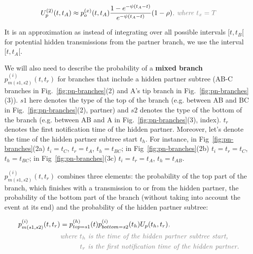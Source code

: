 \documentclass[a4paper,10pt]{article}
\begin{document}
\begin{equation}
U_p^{(2)}(t, t_A) \approx p_o^{(x)}(t, t_A) \frac{1 - e^{-\psi(t_A - t)}}{e^{-\psi(t_A - t)}} (1 - \rho)\textit{\color{gray}, where $t_x =T$}
\end{equation}

It is an approximation as instead of integrating over all possible intervals $[t, t_B[$ for potential hidden transmissions from the partner branch, we use the interval $[t, t_A[$.
 

We will also need to describe the probability of a\textbf{ mixed branch} $p_{m(s1,s2)}^{(i)}(t,t_r)$ for branches that include a hidden partner subtree (AB-C branches in Fig.~\ref{fig:pn-branches}(2) and A's tip branch in Fig.~\ref{fig:pn-branches}(3)). $s1$ here denotes the type of the top of the branch (e.g. between AB and BC in Fig.~\ref{fig:pn-branches}(2), partner) and $s2$ denotes the type of the bottom of the branch (e.g. between AB and A in Fig.~\ref{fig:pn-branches}(3), index). $t_r$ denotes the first notification time of the hidden partner. Moreover, let's denote the time of the hidden partner subtree start $t_h$.  For instance, in Fig~\ref{fig:pn-branches}(2a) $t_i=t_C$, $t_r=t_A$, $t_h=t_{BC}$; in Fig~\ref{fig:pn-branches}(2b) $t_i=t_r=t_C$, $t_h=t_{BC}$; in Fig~\ref{fig:pn-branches}(3c) $t_i=t_r=t_A$, $t_h=t_{AB}$. 

$p_{m(s1,s2)}^{(i)}(t,t_r)$ combines three elements: the probability of the top part of the branch, which finishes with a transmission to or from the hidden partner, the probability of the bottom part of the branch (without taking into account the event at its end) and the probability of the hidden partner subtree:

\begin{equation}
\begin{split}
p_{m(s1,s2)}^{(i)}(t,t_r) &= p_{top=s1}^{(h)}(t)p_{bottom=s2}^{(i)}(t_h)U_p(t_h,t_r)\textit{\color{gray},}\\
&\textit{\color{gray}where $t_h$ is the time of the hidden partner subtree start,}\\
&\textit{\color{gray}~~~~~~~~$t_r$ is the first notification time of the hidden partner.}\\
\end{split}
\end{equation}\label{eq:mixed}
\end{document}
